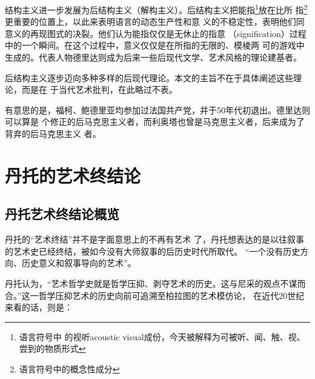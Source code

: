 结构主义进一步发展为后结构主义（解构主义）。后结构主义把能指\footnote{语言符号中
  的视听acoustic visual成份，今天被解释为可被听、闻、触、视、尝到的物质形式}放在比所
指\footnote{语言符号中的概念性成分}更重要的位置上，以此来表明语言的动态生产性和意
义的不稳定性，表明他们同意义的再现图式的决裂。他们认为能指仅仅是无休止的指意
（signification）过程中的一个瞬间。在这个过程中，意义仅仅是在所指的无限的、模棱两
可的游戏中生成的。代表人物德里达则成为后来一些后现代文学、艺术风格的理论建基者。

后结构主义逐步迈向多种多样的后现代理论。本文的主旨不在于具体阐述这些理论，而是在
于当代艺术批判，在此略过不表。

有意思的是，福柯、鲍德里亚均参加过法国共产党，并于50年代初退出。德里达则可以算是
个修正的后马克思主义者，而利奥塔也曾是马克思主义者，后来成为了背弃的后马克思主义
者。

\section{丹托的艺术终结论}

\subsection{丹托艺术终结论概览}丹托的“艺术终结”并不是字面意思上的不再有艺术
了，丹托想表达的是以往叙事的艺术史已经终结，被如今没有大师叙事的后历史时代所取代。
“一个没有历史方向、历史意义和叙事导向的艺术”。

丹托认为，“艺术哲学史就是哲学压抑、剥夺艺术的历史。这与尼采的观点不谋而
合。”\cite{dantuozhenduan}这一哲学压抑艺术的历史向前可追溯至柏拉图的艺术模仿论，
在近代20世纪来看的话，则是：

